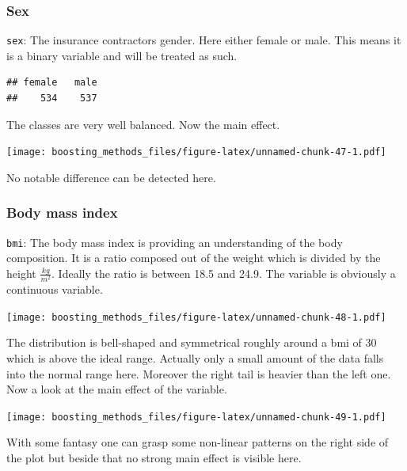 \documentclass[
]{book}
\newenvironment{Shaded}{\begin{snugshade}}{\end{snugshade}}
\newcommand{\FunctionTok}[1]{\textcolor[rgb]{0.00,0.00,0.00}{#1}}
\newcommand{\NormalTok}[1]{#1}
\newcommand{\SpecialCharTok}[1]{\textcolor[rgb]{0.00,0.00,0.00}{#1}}
\begin{document}
\hypertarget{sex}{%
\subsubsection{Sex}\label{sex}}

\texttt{sex}: The insurance contractors gender. Here either female or male. This means it is a binary variable and will be treated as such.

\begin{Shaded}
\end{Shaded}

\begin{verbatim}
## female   male 
##    534    537
\end{verbatim}

The classes are very well balanced. Now the main effect.

\texttt{[image: boosting\_methods\_files/figure-latex/unnamed-chunk-47-1.pdf]}

No notable difference can be detected here.

\hypertarget{body-mass-index}{%
\subsubsection{Body mass index}\label{body-mass-index}}

\texttt{bmi}: The body mass index is providing an understanding of the body composition. It is a ratio composed out of the weight which is divided by the height \(\frac{kg}{m^2}\). Ideally the ratio is between 18.5 and 24.9. The variable is obviously a continuous variable.

\texttt{[image: boosting\_methods\_files/figure-latex/unnamed-chunk-48-1.pdf]}

The distribution is bell-shaped and symmetrical roughly around a bmi of 30 which is above the ideal range. Actually only a small amount of the data falls into the normal range here. Moreover the right tail is heavier than the left one. Now a look at the main effect of the variable.

\texttt{[image: boosting\_methods\_files/figure-latex/unnamed-chunk-49-1.pdf]}

With some fantasy one can grasp some non-linear patterns on the right side of the plot but beside that no strong main effect is visible here.
\end{document}
